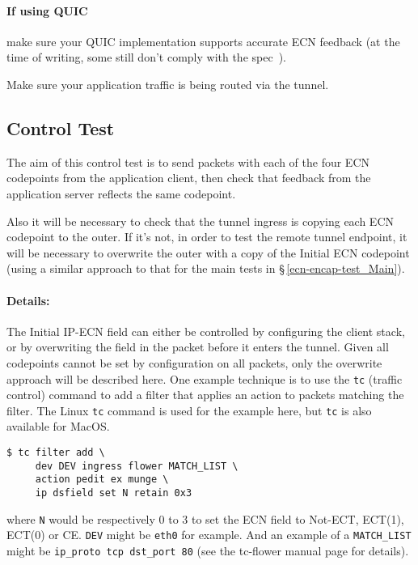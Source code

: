 \paragraph{If using QUIC} make sure your QUIC implementation supports accurate ECN feedback (at the time of writing, some still don't comply with the spec~\cite{Iyengar21:QUIC}).

Make sure your application traffic is being routed via the tunnel.

\subsection{Control Test}\label{ecn-encap-test_Control}

The aim of this control test is to send packets with each of the four ECN codepoints from the application client, then check that feedback from the application server reflects the same codepoint. 

Also it will be necessary to check that the tunnel ingress is copying each ECN codepoint to the outer. If it's not, in order to test the remote tunnel endpoint, it will be necessary to overwrite the outer with a copy of the Initial ECN codepoint (using a similar approach to that for the main tests in \S\,\ref{ecn-encap-test_Main}). 

\paragraph{Details:} The Initial IP-ECN field can either be controlled by configuring the client stack, or by overwriting the field in the packet before it enters the tunnel. Given all codepoints cannot be set by configuration on all packets, only the overwrite approach will be described here. One example technique is to use the \texttt{tc} (traffic control) command to add a filter that applies an action to packets matching the filter. The Linux \texttt{tc} command is used for the example here, but  \texttt{tc} is also available for MacOS.

\begin{verbatim}
$ tc filter add \
     dev DEV ingress flower MATCH_LIST \
     action pedit ex munge \
     ip dsfield set N retain 0x3
\end{verbatim}
where \texttt{N} would be respectively 0 to 3 to set the ECN field to Not-ECT, ECT(1), ECT(0) or CE. \texttt{DEV} might be \texttt{eth0} for example. And an example of a \texttt{MATCH\_LIST} might be \texttt{ip\_proto tcp dst\_port 80} (see the tc-flower manual page for details).

